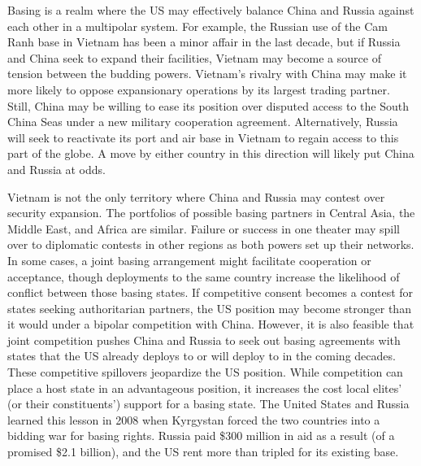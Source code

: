 Basing is a realm where the US may effectively balance China and Russia against each other in a multipolar system. For example, the Russian use of the Cam Ranh base in Vietnam has been a minor affair in the last decade, but if Russia and China seek to expand their facilities, Vietnam may become a source of tension between the budding powers.\cite{yen2021} Vietnam's rivalry with China may make it more likely to oppose expansionary operations by its largest trading partner. Still, China may be willing to ease its position over disputed access to the South China Seas under a new military cooperation agreement. Alternatively, Russia will seek to reactivate its port and air base in Vietnam to regain access to this part of the globe. A move by either country in this direction will likely put China and Russia at odds.




Vietnam is not the only territory where China and Russia may contest over security expansion. The portfolios of possible basing partners in Central Asia, the Middle East, and Africa are similar. Failure or success in one theater may spill over to diplomatic contests in other regions as both powers set up their networks. In some cases, a joint basing arrangement might facilitate cooperation or acceptance, though deployments to the same country increase the likelihood of conflict between those basing states. If competitive consent becomes a contest for states seeking authoritarian partners, the US position may become stronger than it would under a bipolar competition with China. However, it is also feasible that joint competition pushes China and Russia to seek out basing agreements with states that the US already deploys to or will deploy to in the coming decades. These competitive spillovers jeopardize the US position. While competition can place a host state in an advantageous position, it increases the cost local elites' (or their constituents') support for a basing state. The United States and Russia learned this lesson in 2008 when Kyrgystan forced the two countries into a bidding war for basing rights. Russia paid \$300 million in aid as a result (of a promised \$2.1 billion), and the US rent more than tripled for its existing base.\cite{Cooley2020}


